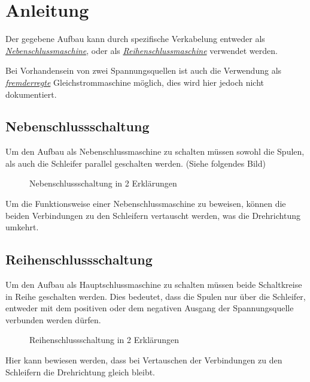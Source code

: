 \section{Anleitung}

Der gegebene Aufbau kann durch spezifische Verkabelung entweder als \hyperref[neben]{\textit{Nebenschlussmaschine}}, oder als \hyperref[reihen]{\textit{Reihenschlussmaschine}} verwendet werden.

Bei Vorhandensein von zwei Spannungsquellen ist auch die Verwendung als \hyperref[fremd]{\textit{fremderregte}} Gleichstrommaschine möglich, dies wird hier jedoch nicht dokumentiert.

\subsection{Nebenschlussschaltung}

Um den Aufbau als Nebenschlussmaschine zu schalten müssen sowohl die Spulen, als auch die Schleifer parallel geschalten werden. (Siehe folgendes Bild)

\begin{figure}[H]
    \centering
    \hfill
    \hfill
    \hfill
    \caption{Nebenschlussschaltung in 2 Erklärungen}
\end{figure}

Um die Funktionsweise einer Nebenschlussmaschine zu beweisen, können die beiden Verbindungen zu den Schleifern vertauscht werden, was die Drehrichtung umkehrt.

\subsection{Reihenschlussschaltung}

Um den Aufbau als Hauptschlussmaschine zu schalten müssen beide Schaltkreise in Reihe geschalten werden.
Dies bedeutet, dass die Spulen nur über die Schleifer, entweder mit dem positiven oder dem negativen Ausgang der Spannungsquelle verbunden werden dürfen.

\begin{figure}[H]
    \centering
    \hfill
    \hfill
    \hfill
    \caption{Reihenschlussschaltung in 2 Erklärungen}
\end{figure}

Hier kann bewiesen werden, dass bei Vertauschen der Verbindungen zu den Schleifern die Drehrichtung gleich bleibt.